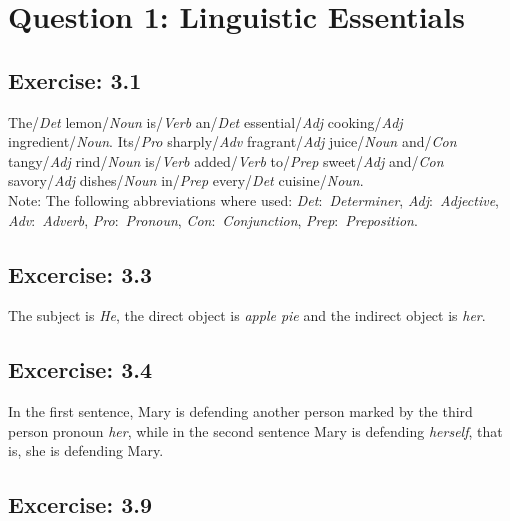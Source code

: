 %
%
%
%

\section*{Question 1: Linguistic Essentials}

\subsection*{Exercise: 3.1}

The/\emph{Det} lemon/\emph{Noun} is/\emph{Verb} an/\emph{Det}
essential/\emph{Adj} cooking/\emph{Adj} ingredient/\emph{Noun}. Its/\emph{Pro}
sharply/\emph{Adv} fragrant/\emph{Adj} juice/\emph{Noun} and/\emph{Con}
tangy/\emph{Adj} rind/\emph{Noun} is/\emph{Verb} added/\emph{Verb}
to/\emph{Prep} sweet/\emph{Adj} and/\emph{Con} savory/\emph{Adj}
dishes/\emph{Noun} in/\emph{Prep} every/\emph{Det} cuisine/\emph{Noun}. \\

\footnotesize{Note: The following abbreviations where used:
	\emph{Det}:~\emph{Determiner}, \emph{Adj}:~\emph{Adjective},
	\emph{Adv}:~\emph{Adverb}, \linebreak \emph{Pro}:~\emph{Pronoun},
	\emph{Con}:~\emph{Conjunction}, \emph{Prep}:~\emph{Preposition}.}
	\normalsize{}

\subsection*{Excercise: 3.3}

The subject is \emph{He}, the direct object is \emph{apple pie} and the
indirect object is \emph{her}.

\subsection*{Excercise: 3.4}

In the first sentence, Mary is defending another person marked by the
third person pronoun \emph{her}, while in the second sentence Mary is
defending \emph{herself}, that is, she is defending Mary.

\subsection*{Excercise: 3.9}

